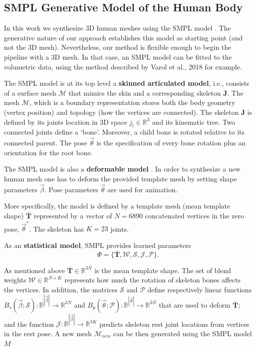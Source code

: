\documentclass[runningheads, orivec]{llncs}
\begin{document}
\subsection{SMPL Generative Model of the Human Body}\label{subsec:smpl_model}
In this work we synthesize 3D human meshes using the SMPL
model \cite{Loper.2015}. The generative nature of our approach establishes this 
model as starting point (and not the 3D mesh). Nevertheless, our method is 
flexible enough to begin the pipeline with a 3D mesh. In that case, an SMPL 
model can be fitted to the volumetric data, using the method described by 
Varol et al., 2018 \cite{varol18_bodynet} for example.

The SMPL model is at its top level a \textbf{skinned articulated 
model}, i.e., 
consists of a 
surface mesh $\mathcal{M}$ that mimics the skin and a corresponding skeleton 
$\mathbf{J}$. The mesh $\mathcal{M}$, which is a boundary 
representation stores 
both the body geometry (vertex position) and topology (how the vertices are 
connected). The skeleton $\mathbf{J}$ is defined by its joints location in 3D 
space $j_i \in \mathbb{R}^3$  and its kinematic tree. Two 
connected 
joints define a `bone'. Moreover, a child bone is rotated relative to 
its 
connected parent. The pose $\vec{\theta}$ is the specification of every bone 
rotation plus an orientation for the root bone.

The SMPL model is also a \textbf{deformable model} 
\cite{Terzopoulos.1987}. In order to 
synthesize a 
new human mesh one has to deform the provided template mesh by 
setting shape parameters $\vec{\beta}$. Pose parameters $\vec{\theta}$ are used 
for animation.

More specifically, the model is defined by a template mesh (mean template 
shape) $\mathbf{\bar{T}}$ represented by a vector of $N = 6890$ concatenated 
vertices in the zero pose, $\vec{\theta}^*$. The skeleton has $K = 23$ joints.

As an \textbf{statistical model}, SMPL provides learned parameters
\begin{equation} \label{eq:smpl_params}
\Phi = \{\mathbf{\bar{T}}, \mathcal{W}, \mathcal{S}, \mathcal{J}, 
\mathcal{P}\}.
\end{equation}

As mentioned above $\mathbf{\bar{T}} \in \mathbb{R}^{3N}$  is the mean template 
shape. The set of blend weights $\mathcal{W} \in \mathbb{R}^{N \times K}$ 
represents 
how much the rotation of 
skeleton bones affects
the vertices. In addition, the matrices $\mathcal{S}$ and $\mathcal{P}$ define 
respectively linear functions $B_s(\vec{\beta}; \mathcal{S}): 
\mathbb{R}^{|\vec{\beta}|} \to 
\mathbb{R}^{3N}$ and $B_p(\vec{\theta}; \mathcal{P}): 
\mathbb{R}^{|\vec{\theta}|} \to 
\mathbb{R}^{3N}$ that are used to deform $\mathbf{\bar{T}}$; and the function 
$\mathcal{J}: \mathbb{R}^{|\vec{\beta}|} \to \mathbb{R}^{3K}$ predicts skeleton 
rest joint locations from vertices in the rest 
pose. A new mesh $\mathcal{M}_{new}$ can be then generated using the SMPL model 
$M$
\end{document}

